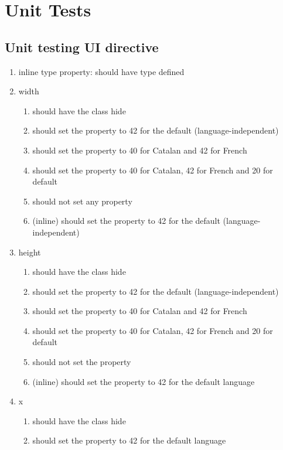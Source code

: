 \chapter{Unit Tests}
\label{chap:app-unittests}
\begin{singlespace}

\section*{Unit testing UI directive}
\begin{enumerate}
\item     inline type property: should have type defined
\item     width
\begin{enumerate}
\item         should have the class hide
\item         should set the property to 42 for the default (language-independent)
\item         should set the property to 40 for Catalan and 42 for French
\item         should set the property to 40 for Catalan, 42 for French and 20 for default
\item         should not set any property
\item         (inline) should set the property to 42 for the default (language-independent)
\end{enumerate}
\item     height
\begin{enumerate}
\item         should have the class hide
\item         should set the property to 42 for the default (language-independent)
\item         should set the property to 40 for Catalan and 42 for French
\item         should set the property to 40 for Catalan, 42 for French and 20 for default
\item         should not set the property
\item         (inline) should set the property to 42 for the default language
\end{enumerate}
\item     x
\begin{enumerate}
\item         should have the class hide
\item         should set the property to 42 for the default language

\end{enumerate}
\end{enumerate}
\end{singlespace}

